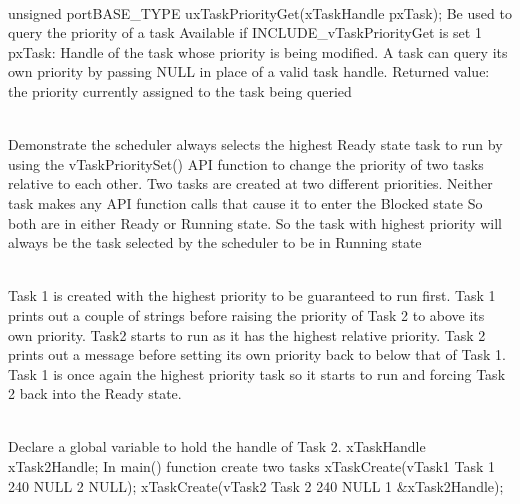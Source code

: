 \begin{description}
\os{\newpage}



\item[{\rot\bf 1.8 Change the priority of a task}]~\\[-3ex]
\bi
\ite unsigned portBASE_TYPE uxTaskPriorityGet(xTaskHandle pxTask);
\bi
\ite Be used to query the priority of a task
\ite Available if INCLUDE_vTaskPriorityGet is set 1
\ite pxTask: Handle of the task whose priority is being modified. A task can query its own priority by passing NULL in place of a valid task handle.
\ite Returned value: the priority currently assigned to the task being queried
\ei
\ei

\os{\newpage}



\item[{\rot\bf Example: Changing task priorities}]~\\[-3ex]
\bi
\ite Demonstrate the scheduler always selects the highest Ready state task to run
\bi
\ite by using the vTaskPrioritySet() API function to change the priority of two tasks relative to each other.
\ei
\ite Two tasks are created at two different priorities.
\bi
\ite Neither task makes any API function calls that cause it to enter the Blocked state
\bi
\ite So both are in either Ready or Running state.
\ite So the task with highest priority will always be the task selected by the scheduler to be in Running state
\ei
\ei
\ei

\os{\newpage}



\item[{\rot\bf Expected Behavior of Example 8}]~\\[-3ex]
\bi
\ite Task 1 is created with the highest priority to be guaranteed to run first. Task 1 prints out a couple of strings before raising the priority of Task 2 to above its own priority.
\ite Task2 starts to run as it has the highest relative priority.
\ite Task 2 prints out a message before setting its own priority back to below that of Task 1.
\ite Task 1 is once again the highest priority task so it starts to run and forcing Task 2 back into the Ready state.
\ei

\os{\newpage}



\item[{\rot\bf }]~\\[-3ex]
\bi
\ite Declare a global variable to hold the handle of Task 2.
\bi
\ite xTaskHandle xTask2Handle;
\ei
\ite In main() function create two tasks
\bi
\ite xTaskCreate(vTask1 Task 1 240
\ite 			NULL 2 NULL);
\ite xTaskCreate(vTask2 Task 2 240
\ite 			NULL 1 \&xTask2Handle);
\ei
\ite
\ei


\end{description}
